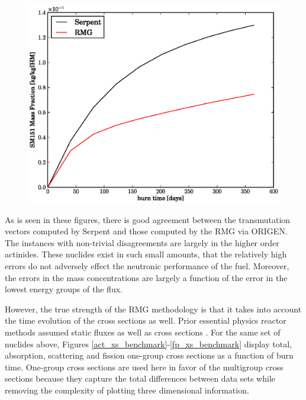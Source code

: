 \begin{figure}[htbp]
\begin{center}
\includegraphics[scale=0.3]{multigroup_method/figs/benchmark/SM151_Mass_Fraction_.eps}
\end{center}
\end{figure}


As is seen in these figures, there is good agreement between the transmutation vectors computed by
Serpent and those computed by the RMG via ORIGEN.  The instances with non-trivial disagreements are 
largely in the higher order actinides.  These nuclides exist in such small amounts, that the relatively
high errors do not adversely effect the neutronic performance of the fuel.   Moreover, the errors in the
mass concentrations are largely a function of the error in the lowest energy groups of the flux.  


However, the true strength of the RMG methodology is 
that it takes into account the time evolution of the cross sections as well.  
Prior essential physics reactor methods assumed static fluxes as well as cross sections \cite{Scopatz2009}.
For the same set 
of nuclides above, Figures \ref{act_xs_benchmark}-\ref{fp_xs_benchmark} display total, absorption,
scattering and fission one-group cross sections as a function of burn time.  One-group cross sections 
are used here in favor of the multigroup cross sections because they capture the total differences 
between data sets while removing the complexity of plotting three dimensional information.

